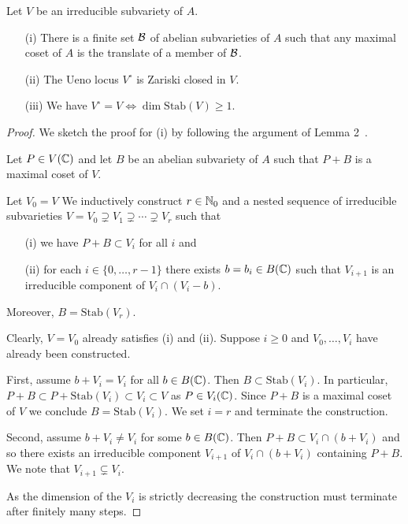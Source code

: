 \begin{theorem}
  \label{thm:ueno}
  Let $V$ be an irreducible subvariety of $A$.
  \begin{enumerate}
  \item [(i)] There is a finite set ${\mathcal B}$ of abelian subvarieties of
    $A$ such that any maximal coset of $A$ is the translate of a
    member of  ${\mathcal B}$.
  \item[(ii)] The Ueno locus $V^{\circ}$ is Zariski closed in $V$.
  \item[(iii)] We have $V^{\circ} = V\Longleftrightarrow \dim\mathrm{Stab}(V)\ge
    1$. 
  \end{enumerate}
\end{theorem}
\begin{proof}
  We sketch the proof for (i) by following the argument  of Lemma
  2~\cite{BombieriZannier:algptsav}. 

  Let $P\in V({\mathbb{C}})$ and let $B$ be an abelian subvariety of $A$ such
  that $P+B$ is a maximal coset of $V$.

  Let $V_0=V$
  We inductively construct $r\in{\mathbb{N}}_0$ and a nested sequence of irreducible subvarieties
  $V=V_0\supsetneq  V_1\supsetneq \cdots \supsetneq V_r$ such that
  \begin{itemize}
  \item [(i)] we have $P+B \subset V_i$ for all $i$ and
  \item[(ii)] for each $i\in \{0,\ldots,r-1\}$ there exists $b=b_i\in B({\mathbb{C}})$
    such that $V_{i+1}$ is an irreducible component of $V_{i}\cap (V_{i}-b)$.
  \end{itemize}
  Moreover, $B = \mathrm{Stab}(V_r)$. 

  Clearly, $V=V_0$ already satisfies (i) and (ii). Suppose $i\ge 0$
  and 
  $V_0,\ldots,V_{i}$ have already been constructed.

  First, assume  $b+V_{i} = V_{i}$ for all $b\in B({\mathbb{C}})$. Then $B\subset
  \mathrm{Stab}(V_{i})$. In particular,
  $P+B\subset P+\mathrm{Stab}(V_{i}) \subset V_{i}\subset V$ as $P\in
  V_{i}({\mathbb{C}})$. Since $P+B$ is a maximal coset of $V$ we conclude
  $B=\mathrm{Stab}(V_i)$. We set $i=r$ and terminate the construction.
  
  Second, assume $b+V_i\not=V_i$ for some $b\in B({\mathbb{C}})$.
  Then $P+B \subset V_i\cap (b+V_i)$ and so there exists an
  irreducible component $V_{i+1}$ of $V_i\cap (b+V_i)$ containing
  $P+B$. We note that $V_{i+1}\subsetneq V_i$.

  As the dimension of the $V_i$ is strictly decreasing the
  construction must terminate after finitely many steps.


\end{proof}
